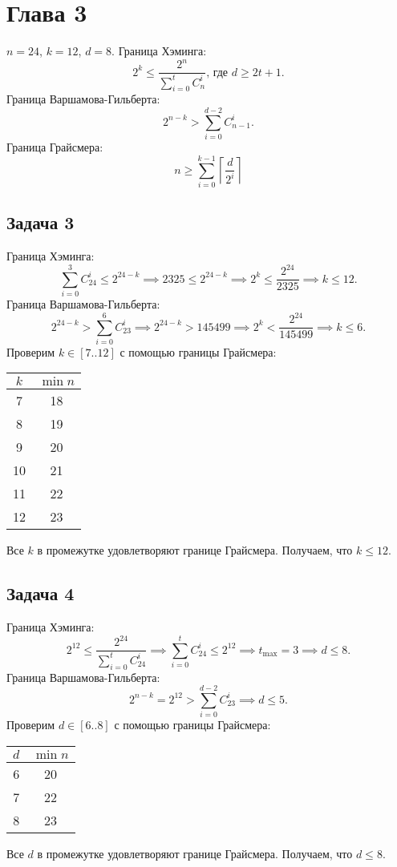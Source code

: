 \documentclass{article}
\begin{document}
\section{\texorpdfstring{Глава 3}{Section 3}}
$n = 24$, $k = 12$, $d = 8$.
Граница Хэминга:
\[
    2^k \leq \frac{2^n}{\sum_{i=0}^t C_n^i} \text{, где } d \geq 2t + 1\text{.}
\]
Граница Варшамова-Гильберта:
\[
    2^{n-k} > \sum_{i=0}^{d-2} C_{n-1}^i\text{.}
\]
Граница Грайсмера:
\[
    n \geq \sum_{i=0}^{k-1} \left\lceil \frac{d}{2^i} \right\rceil
\]

\subsection{\texorpdfstring{Задача 3}{Task 3}}
Граница Хэминга:
\[
    \sum_{i=0}^3 C_{24}^i \leq 2^{24-k} \implies 2325 \leq 2^{24-k} \implies
    2^k \leq \frac{2^{24}}{2325} \implies k \leq 12\text{.}
\]
Граница Варшамова-Гильберта:
\[
    2^{24-k} > \sum_{i=0}^6 C_{23}^i \implies 2^{24-k} > 145499 \implies
    2^k < \frac{2^{24}}{145499} \implies k \leq 6\text{.}
\]
Проверим $k \in [7..12]$ с помощью границы Грайсмера:
\begin{center}
    \begin{tabular}{c c}
        \toprule
        $k$ & $\min n$ \\ \midrule
        7  & 18 \\
        8  & 19 \\
        9  & 20 \\
        10 & 21 \\
        11 & 22 \\
        12 & 23 \\ \bottomrule
    \end{tabular}
\end{center}
Все $k$ в промежутке удовлетворяют границе Грайсмера.
Получаем, что $k \leq 12$.

\subsection{\texorpdfstring{Задача 4}{Task 4}}
Граница Хэминга:
\[
    2^{12} \leq \frac{2^{24}}{\sum_{i=0}^t C_{24}^i} \implies
    \sum_{i=0}^t C_{24}^i \leq 2^{12} \implies
    t_{\max} = 3 \implies d \leq 8 \text{.}
\]
Граница Варшамова-Гильберта:
\[
    2^{n-k} = 2^{12} > \sum_{i=0}^{d-2} C_{23}^i \implies d \leq 5\text{.}
\]
Проверим $d \in [6..8]$ с помощью границы Грайсмера:
\begin{center}
    \begin{tabular}{c c}
        \toprule
        $d$ & $\min n$ \\ \midrule
        6 & 20 \\
        7 & 22 \\
        8 & 23 \\ \bottomrule
    \end{tabular}
\end{center}
Все $d$ в промежутке удовлетворяют границе Грайсмера.
Получаем, что $d \leq 8$.
\end{document}
